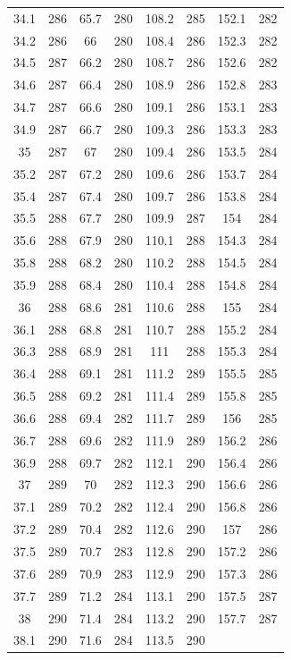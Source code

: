 \documentclass[12pt]{ctexart}
\numberwithin{equation}{section}
\begin{document}
\begin{longtable}{cc|cc|cc|cc}
34.1  &  286  &  65.7  &  280  &  108.2  &  285  &  152.1  &  282  \\
34.2  &  286  &  66  &  280  &  108.4  &  286  &  152.3  &  282  \\
34.5  &  287  &  66.2  &  280  &  108.7  &  286  &  152.6  &  282  \\
34.6  &  287  &  66.4  &  280  &  108.9  &  286  &  152.8  &  283  \\
34.7  &  287  &  66.6  &  280  &  109.1  &  286  &  153.1  &  283  \\
34.9  &  287  &  66.7  &  280  &  109.3  &  286  &  153.3  &  283  \\
35  &  287  &  67  &  280  &  109.4  &  286  &  153.5  &  284  \\
35.2  &  287  &  67.2  &  280  &  109.6  &  286  &  153.7  &  284  \\
35.4  &  287  &  67.4  &  280  &  109.7  &  286  &  153.8  &  284  \\
35.5  &  288  &  67.7  &  280  &  109.9  &  287  &  154  &  284  \\
35.6  &  288  &  67.9  &  280  &  110.1  &  288  &  154.3  &  284  \\
35.8  &  288  &  68.2  &  280  &  110.2  &  288  &  154.5  &  284  \\
35.9  &  288  &  68.4  &  280  &  110.4  &  288  &  154.8  &  284  \\
36  &  288  &  68.6  &  281  &  110.6  &  288  &  155  &  284  \\
36.1  &  288  &  68.8  &  281  &  110.7  &  288  &  155.2  &  284  \\
36.3  &  288  &  68.9  &  281  &  111  &  288  &  155.3  &  284  \\
36.4  &  288  &  69.1  &  281  &  111.2  &  289  &  155.5  &  285  \\
36.5  &  288  &  69.2  &  281  &  111.4  &  289  &  155.8  &  285  \\
36.6  &  288  &  69.4  &  282  &  111.7  &  289  &  156  &  285  \\
36.7  &  288  &  69.6  &  282  &  111.9  &  289  &  156.2  &  286  \\
36.9  &  288  &  69.7  &  282  &  112.1  &  290  &  156.4  &  286  \\
37  &  289  &  70  &  282  &  112.3  &  290  &  156.6  &  286  \\
37.1  &  289  &  70.2  &  282  &  112.4  &  290  &  156.8  &  286  \\
37.2  &  289  &  70.4  &  282  &  112.6  &  290  &  157  &  286  \\
37.5  &  289  &  70.7  &  283  &  112.8  &  290  &  157.2  &  286  \\
37.6  &  289  &  70.9  &  283  &  112.9  &  290  &  157.3  &  286  \\
37.7  &  289  &  71.2  &  284  &  113.1  &  290  &  157.5  &  287  \\
38  &  290  &  71.4  &  284  &  113.2  &  290  &  157.7  &  287  \\
38.1  &  290  &  71.6  &  284  &  113.5  &  290  \\

\end{longtable}
\end{document}
